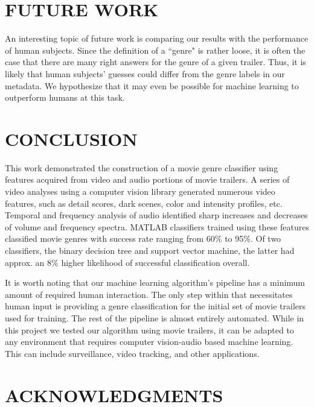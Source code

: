 \documentclass[letterpaper, 10 pt, conference]{ieeeconf}  %
\begin{document}
\section{FUTURE WORK}
An interesting topic of future work is comparing our results with the performance of human subjects. Since the definition of a ``genre" is rather loose, it is often the case that there are many right answers for the genre of a given trailer. Thus, it is likely that human subjects' guesses could differ from the genre labels in our metadata. We hypothesize that it may even be possible for machine learning to outperform humans at this task.

\section{CONCLUSION}
This work demonstrated the construction of a movie genre classifier using features acquired from video and audio portions of movie trailers. A series of video analyses using a computer vision library generated numerous video features, such as detail scores, dark scenes, color and intensity profiles, etc. Temporal and frequency analysis of audio identified sharp increases and decreases of volume and frequency spectra. MATLAB classifiers trained using these features classified movie genres with success rate ranging from 60\% to 95\%. Of two classifiers, the binary decision tree and support vector machine, the latter had approx. an 8\% higher likelihood of successful classification overall.

It is worth noting that our machine learning algorithm's pipeline has a minimum amount of required human interaction. The only step within that necessitates human input is providing a genre classification for the initial set of movie trailers used for training. The rest of the pipeline is almost entirely automated. While in this project we tested our algorithm using movie trailers, it can be adapted to any environment that requires computer vision-audio based machine learning. This can include surveillance, video tracking, and other applications.

\section{ACKNOWLEDGMENTS}
\end{document}
